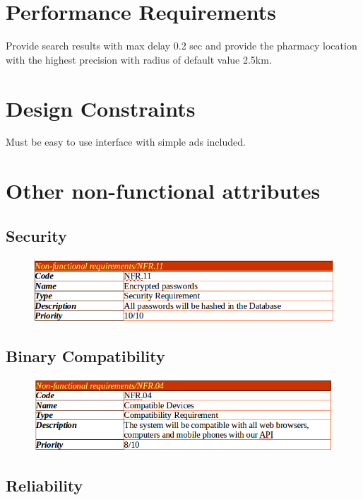 \documentclass[]{article}
\begin{document}
\section{Performance Requirements}
Provide search results with max delay 0.2 sec 
and provide the pharmacy location with the highest precision with radius of default value 2.5km.
\section{Design Constraints}
Must be easy to use interface with simple ads included.

\section{Other non-functional attributes}

\subsection {Security}

\begin{figure}[H]
\centering
\includegraphics[scale=0.4]{./nonf/01}
\end{figure}

\subsection {Binary Compatibility}

\begin{figure}[H]
\centering
\includegraphics[scale=0.4]{./nonf/02}
\end{figure}

\subsection {Reliability}
\end{document}
